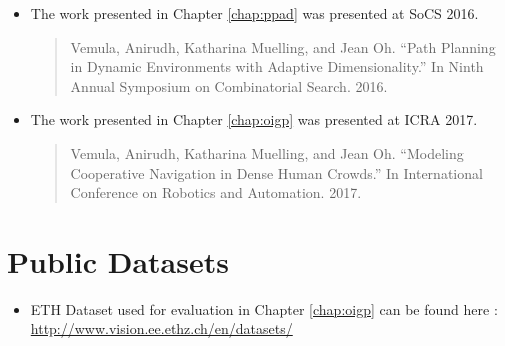 \documentclass[twoside,10pt]{report}
\begin{document}
\begin{itemize}
\item The work presented in Chapter \ref{chap:ppad} was presented at SoCS 2016.
  \begin{quote}
    Vemula, Anirudh, Katharina Muelling, and Jean Oh. ``Path Planning in Dynamic Environments with Adaptive Dimensionality.'' In Ninth Annual Symposium on Combinatorial Search. 2016.
  \end{quote}
\item The work presented in Chapter \ref{chap:oigp} was presented at ICRA 2017.
  \begin{quote}
    Vemula, Anirudh, Katharina Muelling, and Jean Oh. ``Modeling Cooperative Navigation in Dense Human Crowds.'' In International Conference on Robotics and Automation. 2017.
  \end{quote}  
\end{itemize}

\chapter{Public Datasets}
\label{cha:public-datasets}

\begin{itemize}
\item ETH Dataset used for evaluation in Chapter \ref{chap:oigp} can be found here : \url{http://www.vision.ee.ethz.ch/en/datasets/}
\end{itemize}


% 
{\small }
\end{document}
